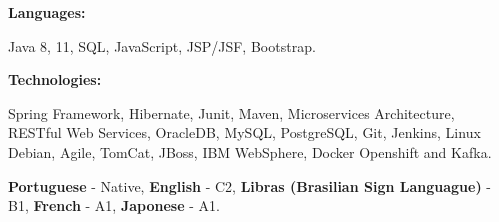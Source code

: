 \documentclass[9pt]{developercv} %
\begin{document}
\hfill %
\begin{minipage}[t]{0.465\textwidth}
    \vspace{-6pt}
    
    \begin{minipage}[t]{0.2\textwidth}
        \textbf{Languages:}
    \end{minipage}
    \hfill
    \begin{minipage}[t]{0.73\textwidth}
      Java 8, 11, SQL, JavaScript, JSP/JSF, Bootstrap.  
    \end{minipage}
    \vspace{4mm}
    
    \begin{minipage}[t]{0.2\textwidth}
        \textbf{Technologies:}
    \end{minipage}
    \hfill
    \begin{minipage}[t]{0.73\textwidth}
      Spring Framework, Hibernate, Junit, Maven, Microservices Architecture, RESTful Web Services, OracleDB, MySQL, PostgreSQL, Git, Jenkins, Linux Debian, Agile, TomCat, JBoss, IBM WebSphere, Docker Openshift and Kafka.
    \end{minipage}
    
\end{minipage}
\vspace{0.5 pt}
    \vspace{-6pt}
    \begin{center} \textbf{Portuguese} - Native, \textbf{English} - C2, \textbf{Libras (Brasilian Sign Languague)} - B1, \textbf{French} - A1, \textbf{Japonese} - A1. \end{center}
\vspace{0.5 pt}
\end{document}
